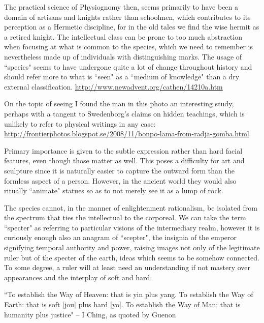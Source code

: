 \begin{footnotesize}
\begin{sffamily}
The practical science of Physiognomy then, seems primarily to have been a domain of artisans and knights rather than schoolmen, which contributes to its perception as a Hermetic discipline, for in the old tales we find the wise hermit as a retired knight. The intellectual class can be prone to too much abstraction when focusing at what is common to the species, which we need to remember is nevertheless made up of individuals with distinguishing marks. The usage of ``species" seems to have undergone quite a lot of change throughout history and should refer more to what is ``seen" as a ``medium of knowledge" than a dry external classification. \url{http://www.newadvent.org/cathen/14210a.htm}

On the topic of seeing I found the man in this photo an interesting study, perhaps with a tangent to Swedenborg's claims on hidden teachings, which is unlikely to refer to physical writings in any case: \url{http://frontierphotos.blogspot.se/2008/11/bonpo-lama-from-radja-gomba.html}

Primary importance is given to the subtle expression rather than hard facial features, even though those matter as well. This poses a difficulty for art and sculpture since it is naturally easier to capture the outward form than the formless aspect of a person. However, in the ancient world they would also ritually ``animate" statues so as to not merely see it as a lump of rock. 

The species cannot, in the manner of enlightenment rationalism, be isolated from the spectrum that ties the intellectual to the corporeal. We can take the term ``specter" as referring to particular visions of the intermediary realm, however it is curiously enough also an anagram of ``scepter", the insignia of the emperor signifying temporal authority and power, raising images not only of the legitimate ruler but of the specter of the earth, ideas which seems to be somehow connected. To some degree, a ruler will at least need an understanding if not mastery over appearances and the interplay of soft and hard.

``To establish the Way of Heaven: that is yin plus yang. To establish the Way of Earth: that is soft [jou] plus hard [yo]. To establish the Way of Man: that is humanity plus justice" – I Ching, as quoted by Guenon


\end{sffamily}\end{footnotesize}
